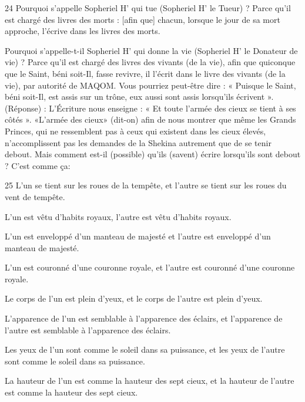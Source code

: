 \par 24 Pourquoi s'appelle Sopheriel H' qui tue (Sopheriel H' le Tueur) ? Parce qu'il est chargé des livres des morts : [afin que] chacun, lorsque le jour de sa mort approche, l'écrive dans les livres des morts.

\par Pourquoi s'appelle-t-il Sopheriel H' qui donne la vie (Sopheriel H' le Donateur de vie) ? Parce qu'il est chargé des livres des vivants (de la vie), afin que quiconque que le Saint, béni soit-Il, fasse revivre, il l'écrit dans le livre des vivants (de la vie), par autorité de MAQOM. Vous pourriez peut-être dire : « Puisque le Saint, béni soit-Il, est assis sur un trône, eux aussi sont assis lorsqu'ils écrivent ». (Réponse) : L'Écriture nous enseigne : « Et toute l'armée des cieux se tient à ses côtés ». «L'armée des cieux» (dit-on) afin de nous montrer que même les Grands Princes, qui ne ressemblent pas à ceux qui existent dans les cieux élevés, n'accomplissent pas les demandes de la Shekina autrement que de se tenir debout. Mais comment est-il (possible) qu’ils (savent) écrire lorsqu’ils sont debout ? C'est comme ça:

\par 25 L'un se tient sur les roues de la tempête, et l'autre se tient sur les roues du vent de tempête.

\par L'un est vêtu d'habits royaux, l'autre est vêtu d'habits royaux.

\par L'un est enveloppé d'un manteau de majesté et l'autre est enveloppé d'un manteau de majesté.

\par L'un est couronné d'une couronne royale, et l'autre est couronné d'une couronne royale.

\par Le corps de l'un est plein d'yeux, et le corps de l'autre est plein d'yeux.

\par L'apparence de l'un est semblable à l'apparence des éclairs, et l'apparence de l'autre est semblable à l'apparence des éclairs.

\par Les yeux de l'un sont comme le soleil dans sa puissance, et les yeux de l'autre sont comme le soleil dans sa puissance.

\par La hauteur de l'un est comme la hauteur des sept cieux, et la hauteur de l'autre est comme la hauteur des sept cieux.

